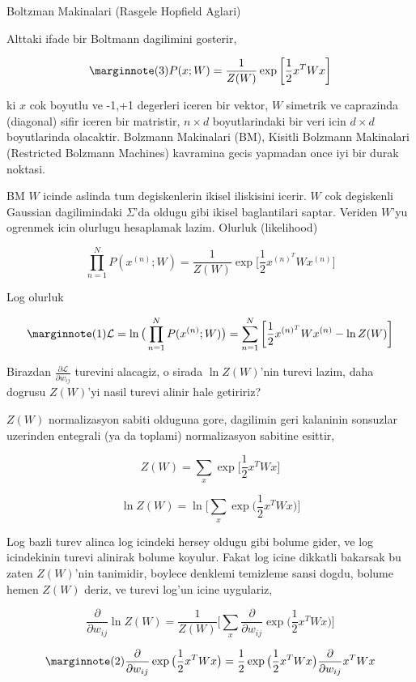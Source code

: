 \documentclass[12pt,fleqn]{article}\usepackage{../common}
\begin{document}
Boltzman Makinalari (Rasgele Hopfield Aglari) 

Alttaki ifade bir Boltmann dagilimini gosterir, 

$$  
\mlabel{3}
P(x;W) = \frac{1}{Z(W)} 
\exp \bigg[ \frac{1}{2} x^T W x \bigg]
$$

ki $x$ cok boyutlu ve -1,+1 degerleri iceren bir vektor, $W$ simetrik ve
caprazinda (diagonal) sifir iceren bir matristir, $n \times d$
boyutlarindaki bir veri icin $d \times d$ boyutlarinda olacaktir.  Bolzmann
Makinalari (BM), Kisitli Bolzmann Makinalari (Restricted Bolzmann Machines)
kavramina gecis yapmadan once iyi bir durak noktasi. 

BM $W$ icinde aslinda tum degiskenlerin ikisel iliskisini icerir. $W$ cok
degiskenli Gaussian dagilimindaki $\Sigma$'da oldugu gibi ikisel
baglantilari saptar. Veriden $W$'yu ogrenmek icin olurlugu hesaplamak
lazim. Olurluk (likelihood)

$$  
\prod _{n=1}^{N} P(x^{(n)};W) = \frac{1}{Z(W)} 
\exp \bigg[ \frac{1}{2} x^{(n)^T} W x^{(n)} \bigg]
$$

Log olurluk

$$  
\mlabel{1}
\mathcal{L} = \ln \big( \prod _{n=1}^{N} P(x^{(n)};W) \big) = 
\sum _{n=1}^{N} \bigg[ \frac{1}{2} x^{(n)^T} W x^{(n)} - \ln Z(W) \bigg]
$$

Birazdan $\frac{\partial \mathcal L}{\partial w_{ij}}$ turevini alacagiz, o sirada $\ln Z(W)$'nin turevi lazim, 
daha dogrusu $Z(W)$'yi nasil turevi alinir hale getiririz?

$Z(W)$ normalizasyon sabiti olduguna gore, dagilimin geri kalaninin
sonsuzlar uzerinden entegrali (ya da toplami) normalizasyon sabitine
esittir, 

$$ 
Z(W) = \sum_x  \exp \bigg[ \frac{1}{2} x^T W x \bigg]
 $$

$$ 
\ln Z(W) = \ln \bigg[ \sum_x  \exp \big( \frac{1}{2} x^T W x \big) \bigg]
 $$

Log bazli turev alinca log icindeki hersey oldugu gibi bolume gider, ve log
icindekinin turevi alinirak bolume koyulur. Fakat log icine dikkatli
bakarsak bu zaten $Z(W)$'nin tanimidir, boylece denklemi temizleme sansi
dogdu, bolume hemen $Z(W)$ deriz, ve turevi log'un icine uygulariz,


$$ 
\frac{\partial}{\partial w_{ij}} \ln Z(W) = 
\frac{1}{Z(W)}
\bigg[ 
\sum_x \frac{\partial}{\partial w_{ij}} \exp \big( \frac{1}{2} x^T W x \big) 
\bigg]
 $$


$$ 
\mlabel{2}
\frac{\partial}{\partial w_{ij}} \exp \big( \frac{1}{2} x^T W x \big)  = 
\frac{1}{2}  \exp \big( \frac{1}{2} x^T W x \big) 
\frac{\partial}{\partial w_{ij}}x^T W x
$$
\end{document}
